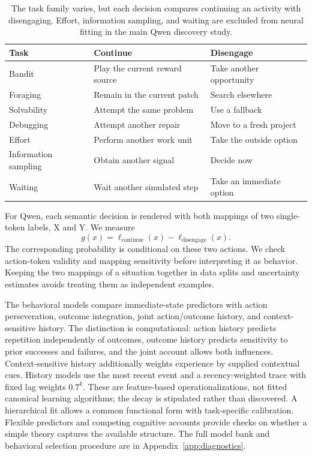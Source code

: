 \documentclass{article}
\begin{document}
\begin{table}[htbp]
\centering\small
\begin{tabular}{lll}
\toprule
Task & Continue & Disengage \\
\midrule
Bandit & Play the current reward source & Take another opportunity \\
Foraging & Remain in the current patch & Search elsewhere \\
Solvability & Attempt the same problem & Use a fallback \\
Debugging & Attempt another repair & Move to a fresh project \\
Effort & Perform another work unit & Take the outside option \\
Information sampling & Obtain another signal & Decide now \\
Waiting & Wait another simulated step & Take an immediate option \\
\bottomrule
\end{tabular}
\caption{The task family varies, but each decision compares continuing an activity with disengaging. Effort, information sampling, and waiting are excluded from neural fitting in the main Qwen discovery study.}
\label{tab:tasks}
\end{table}

For Qwen, each semantic decision is rendered with both mappings of two single-token labels, X and Y. We measure
\begin{equation}
g(x)=\ell_{\mathrm{continue}}(x)-\ell_{\mathrm{disengage}}(x).
\end{equation}
The corresponding probability is conditional on these two actions. We check action-token validity and mapping sensitivity before interpreting it as behavior. Keeping the two mappings of a situation together in data splits and uncertainty estimates avoids treating them as independent examples.

The behavioral models compare immediate-state predictors with action perseveration, outcome integration, joint action/outcome history, and context-sensitive history. The distinction is computational: action history predicts repetition independently of outcomes, outcome history predicts sensitivity to prior successes and failures, and the joint account allows both influences. Context-sensitive history additionally weights experience by supplied contextual cues. History models use the most recent event and a recency-weighted trace with fixed lag weights $0.7^k$. These are feature-based operationalizations, not fitted canonical learning algorithms; the decay is stipulated rather than discovered. A hierarchical fit allows a common functional form with task-specific calibration. Flexible predictors and competing cognitive accounts provide checks on whether a simple theory captures the available structure. The full model bank and behavioral selection procedure are in Appendix~\ref{app:diagnostics}.
\end{document}
